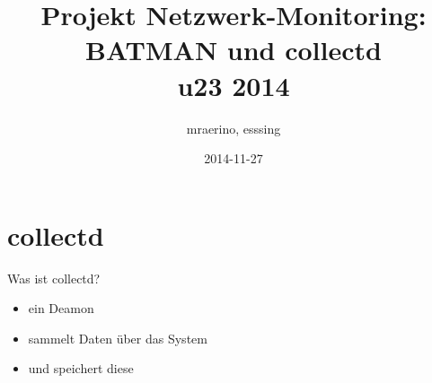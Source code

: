 \documentclass[ngerman,compress,aspectratio=169]{beamer}
\title[Projekt Netzwerk-Monitoring - u23 2014]
{\textbf{Projekt Netzwerk-Monitoring: \\ BATMAN und collectd} \\u23 2014}
\author[mraerino, esssing]
{mraerino, esssing}
\institute[Chaos Computer Club Cologne]
{
Chaos Computer Club Cologne e.V.\\
\url{https://koeln.ccc.de}
}
\date{2014-11-27}
\begin{document}
\begin{frame}
	\titlepage
\end{frame}

\begin{frame}
	\tableofcontents
\end{frame}

\section{collectd}

\begin{frame}{Was ist collectd?}
	\begin{itemize}
		\pause
		\item ein Deamon
		\pause
		\item sammelt Daten \"uber das System
		\pause
		\item und speichert diese
	\end{itemize}
\end{frame}
\end{document}
